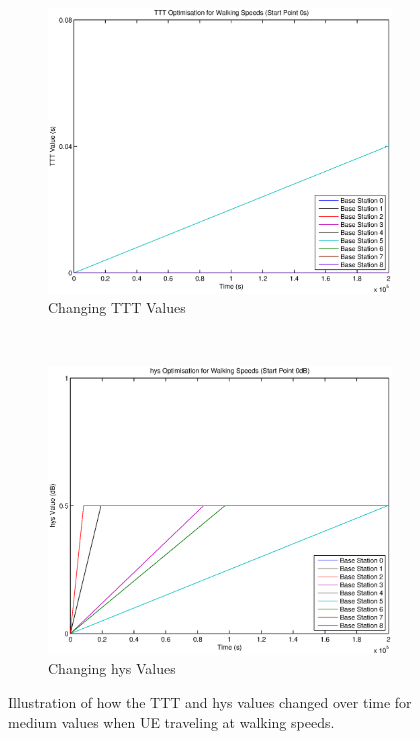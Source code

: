 \begin{figure}[H]
        \centering
        \begin{subfigure}[b]{0.49\textwidth}
                \includegraphics[width=\textwidth]{figures/walking_figures/low/long_ttt.eps}
                \caption{Changing TTT Values}
                \label{fig:walk_low_ttt}
        \end{subfigure}%
        ~ %
        \begin{subfigure}[b]{0.49\textwidth}
                \includegraphics[width=\textwidth]{figures/walking_figures/low/long_hys.eps}
                \caption{Changing hys Values}
                \label{fig:walk_low_hys}
        \end{subfigure}
        \caption{Illustration of how the TTT and hys values changed over time for medium values when UE traveling at walking speeds.}\label{fig:walk_low_ttthys}
\end{figure}


